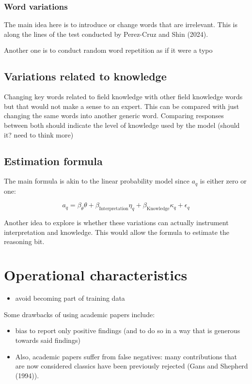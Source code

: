 \documentclass[
]{article}
\providecommand{\tightlist}{%
  \setlength{\itemsep}{0pt}\setlength{\parskip}{0pt}}\usepackage{longtable,booktabs,array}
\begin{document}
\subsubsection{Word variations}\label{word-variations}

The main idea here is to introduce or change words that are irrelevant.
This is along the lines of the test conducted by Perez-Cruz and Shin
(2024).

Another one is to conduct random word repetition as if it were a typo

\subsection{Variations related to
knowledge}\label{variations-related-to-knowledge}

Changing key words related to field knowledge with other field knowledge
words but that would not make a sense to an expert. This can be compared
with just changing the same words into another generic word. Comparing
responses between both should indicate the level of knowledge used by
the model (should it? need to think more)

\subsection{Estimation formula}\label{estimation-formula}

The main formula is akin to the linear probability model since \(a_{q}\)
is either zero or one:

\[
a_{q} = \beta_{\theta} \theta + \beta_{\text{Interpretation}} \eta_q + \beta_{\text{Knowledge}} \kappa_q + \epsilon_q
\]

Another idea to explore is whether these variations can actually
instrument interpretation and knowledge. This would allow the formula to
estimate the reasoning bit.

\section{Operational characteristics}\label{operational-characteristics}

\begin{itemize}
\tightlist
\item
  avoid becoming part of training data
\end{itemize}

Some drawbacks of using academic papers include:

\begin{itemize}
\tightlist
\item
  bias to report only positive findings (and to do so in a way that is
  generous towards said findings)
\item
  Also, academic papers suffer from false negatives: many contributions
  that are now considered classics have been previously rejected (Gans
  and Shepherd (1994)).
\end{itemize}
\end{document}
